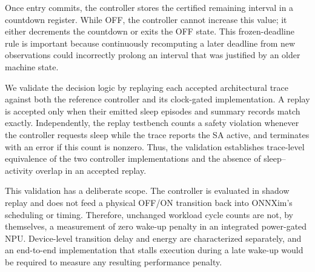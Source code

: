 Once entry commits, the controller stores the certified remaining interval in
a countdown register.  While OFF, the controller cannot increase this value;
it either decrements the countdown or exits the OFF state.  This frozen-deadline
rule is important because continuously recomputing a later deadline from new
observations could incorrectly prolong an interval that was justified by an
older machine state.

We validate the decision logic by replaying each accepted architectural trace
against both the reference controller and its clock-gated implementation.  A
replay is accepted only when their emitted sleep episodes and summary records
match exactly.  Independently, the replay testbench counts a safety violation
whenever the controller requests sleep while the trace reports the SA active,
and terminates with an error if this count is nonzero.  Thus, the validation
establishes trace-level equivalence of the two controller implementations and
the absence of sleep--activity overlap in an accepted replay.

This validation has a deliberate scope.  The controller is evaluated in
shadow replay and does not feed a physical OFF/ON transition back into
ONNXim's scheduling or timing.  Therefore, unchanged workload cycle counts are
not, by themselves, a measurement of zero wake-up penalty in an integrated
power-gated NPU.  Device-level transition delay and energy are characterized
separately, and an end-to-end implementation that stalls execution during a
late wake-up would be required to measure any resulting performance penalty.
